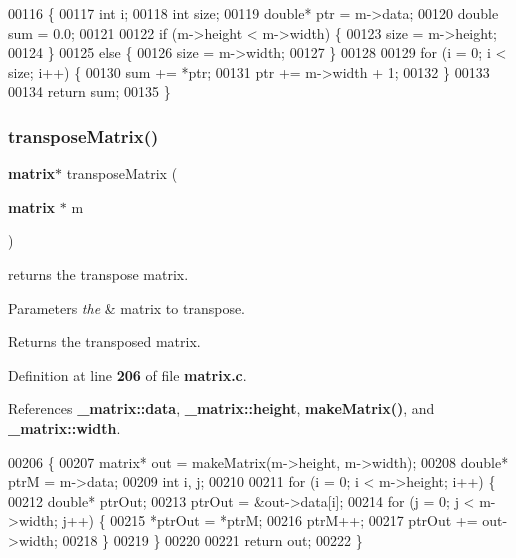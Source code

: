 \begin{DoxyCode}
00116                               \{
00117     \textcolor{keywordtype}{int} i;
00118     \textcolor{keywordtype}{int} size;
00119     \textcolor{keywordtype}{double}* ptr = m->data;
00120     \textcolor{keywordtype}{double} sum = 0.0;
00121 
00122     \textcolor{keywordflow}{if} (m->height < m->width) \{
00123         size = m->height;
00124     \}
00125     \textcolor{keywordflow}{else} \{
00126         size = m->width;
00127     \}
00128 
00129     \textcolor{keywordflow}{for} (i = 0; i < size; i++) \{
00130         sum += *ptr;
00131         ptr += m->width + 1;
00132     \}
00133 
00134     \textcolor{keywordflow}{return} sum;
00135 \}
\end{DoxyCode}
\mbox{\label{matrix_8h_a2936260302742748b0639e8ec71d4d9f}} 
\subsubsection{transpose\+Matrix()}
{\footnotesize\ttfamily \textbf{ matrix}$\ast$ transpose\+Matrix (\begin{DoxyParamCaption}\item[{\textbf{ matrix} $\ast$}]{m }\end{DoxyParamCaption})}



returns the transpose matrix. 


\begin{DoxyParams}{Parameters}
{\em the} & matrix to transpose. \\
\hline
\end{DoxyParams}
\begin{DoxyReturn}{Returns}
the transposed matrix. 
\end{DoxyReturn}


Definition at line \textbf{ 206} of file \textbf{ matrix.\+c}.



References \textbf{ \+\_\+matrix\+::data}, \textbf{ \+\_\+matrix\+::height}, \textbf{ make\+Matrix()}, and \textbf{ \+\_\+matrix\+::width}.


\begin{DoxyCode}
00206                                    \{
00207     matrix* out = makeMatrix(m->height, m->width);
00208     \textcolor{keywordtype}{double}* ptrM = m->data;
00209     \textcolor{keywordtype}{int} i, j;
00210 
00211     \textcolor{keywordflow}{for} (i = 0; i < m->height; i++) \{
00212         \textcolor{keywordtype}{double}* ptrOut;
00213         ptrOut = &out->data[i];
00214         \textcolor{keywordflow}{for} (j = 0; j < m->width; j++) \{
00215             *ptrOut = *ptrM;
00216             ptrM++;
00217             ptrOut += out->width;
00218         \}
00219     \}
00220 
00221     \textcolor{keywordflow}{return} out;
00222 \}
\end{DoxyCode}
